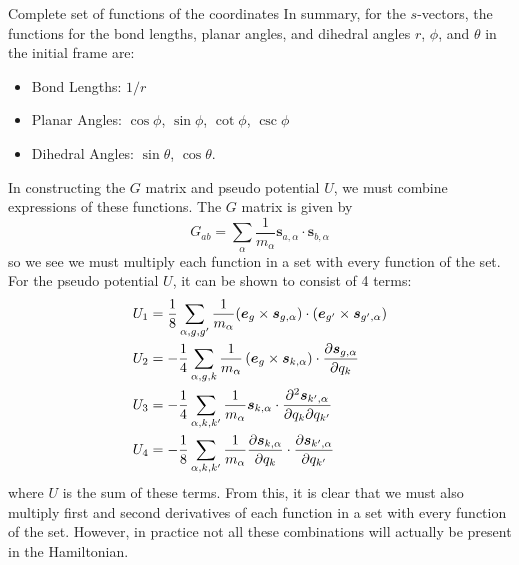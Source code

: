 \documentclass{article}
\newcommand{\vect}[1]{\boldsymbol{#1}}
\begin{document}
\begin{subsection}{Complete set of functions of the coordinates}
	In summary, for the $s$-vectors, the functions for the bond lengths, planar angles, and dihedral angles $r$, $\phi$, and $\theta$ in the initial frame are:
	\begin{itemize}
		\item Bond Lengths: $1/r$ 
		\item Planar Angles: $\cos \phi$, $\sin \phi$, $\cot \phi$, $\csc \phi$ 
		\item Dihedral Angles: $\sin \theta$, $\cos \theta$.
	\end{itemize}
In constructing the $G$ matrix and pseudo potential $U$, we must combine expressions of these functions. The $G$ matrix is given by 
	\[
		G_{ab} = \sum_{\alpha} \frac{1}{m_\alpha}\vect{s}_{a, \alpha}\cdot \vect{s}_{b, \alpha}
	\]
so we see we must multiply each function in a set with every function of the set. For the pseudo potential $U$, it can be shown to consist of 4 terms:
\[
	\begin{split}
		U_1 &= \frac{1}{8} \sum_{\alpha, g, g'} \frac{1}{m_\alpha} (\vect{e}_{g} \times \vect{s}_{g, \alpha})\cdot(\vect{e}_{g'} \times \vect{s}_{g', \alpha}) \\
		U_2 &= -\frac{1}{4} \sum_{\alpha, g, k}\frac{1}{m_\alpha} \left(\vect{e}_g \times \vect{s}_{k, \alpha}\right)\cdot \pdv{\vect{s}_{g, \alpha}}{q_k}  \\ 
		U_3 &= -\frac{1}{4} \sum_{\alpha, k, k'} \frac{1}{m_\alpha} \vect{s}_{k, \alpha}\cdot \pdv{\vect{s}_{k', \alpha}}{q_k}{q_{k'}} \\ 
		U_4 &= -\frac{1}{8} \sum_{\alpha, k, k'} \frac{1}{m_\alpha} \pdv{\vect{s}_{k, \alpha}}{q_k}\cdot \pdv{\vect{s}_{k', \alpha}}{q_{k'}} \\
	\end{split}
\]
where $U$ is the sum of these terms. From this, it is clear that we must also multiply first and second derivatives of each function in a set with every function of the set. However, in practice not all these combinations will actually be present in the Hamiltonian. 
\end{subsection}
\end{document}
